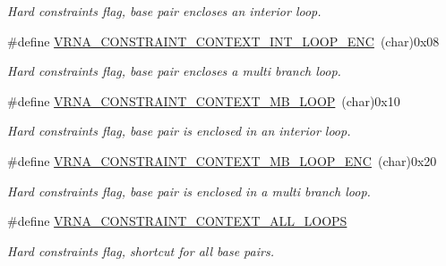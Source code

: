 \begin{DoxyCompactItemize}
\begin{DoxyCompactList}\small\item\em Hard constraints flag, base pair encloses an interior loop. \end{DoxyCompactList}\item 
\hypertarget{group__hard__constraints_ga0536288e04ff6332ecdc23ca4705402b}{\#define \hyperlink{group__hard__constraints_ga0536288e04ff6332ecdc23ca4705402b}{V\-R\-N\-A\-\_\-\-C\-O\-N\-S\-T\-R\-A\-I\-N\-T\-\_\-\-C\-O\-N\-T\-E\-X\-T\-\_\-\-I\-N\-T\-\_\-\-L\-O\-O\-P\-\_\-\-E\-N\-C}~(char)0x08}\label{group__hard__constraints_ga0536288e04ff6332ecdc23ca4705402b}

\begin{DoxyCompactList}\small\item\em Hard constraints flag, base pair encloses a multi branch loop. \end{DoxyCompactList}\item 
\hypertarget{group__hard__constraints_ga456ecd2ff00056bb64da8dd4f61bbfc5}{\#define \hyperlink{group__hard__constraints_ga456ecd2ff00056bb64da8dd4f61bbfc5}{V\-R\-N\-A\-\_\-\-C\-O\-N\-S\-T\-R\-A\-I\-N\-T\-\_\-\-C\-O\-N\-T\-E\-X\-T\-\_\-\-M\-B\-\_\-\-L\-O\-O\-P}~(char)0x10}\label{group__hard__constraints_ga456ecd2ff00056bb64da8dd4f61bbfc5}

\begin{DoxyCompactList}\small\item\em Hard constraints flag, base pair is enclosed in an interior loop. \end{DoxyCompactList}\item 
\hypertarget{group__hard__constraints_ga02a3d703ddbcfce393e4bbfcb9db7077}{\#define \hyperlink{group__hard__constraints_ga02a3d703ddbcfce393e4bbfcb9db7077}{V\-R\-N\-A\-\_\-\-C\-O\-N\-S\-T\-R\-A\-I\-N\-T\-\_\-\-C\-O\-N\-T\-E\-X\-T\-\_\-\-M\-B\-\_\-\-L\-O\-O\-P\-\_\-\-E\-N\-C}~(char)0x20}\label{group__hard__constraints_ga02a3d703ddbcfce393e4bbfcb9db7077}

\begin{DoxyCompactList}\small\item\em Hard constraints flag, base pair is enclosed in a multi branch loop. \end{DoxyCompactList}\item 
\hypertarget{group__hard__constraints_ga886d9127c49bb982a4b67cd7581e8a5a}{\#define \hyperlink{group__hard__constraints_ga886d9127c49bb982a4b67cd7581e8a5a}{V\-R\-N\-A\-\_\-\-C\-O\-N\-S\-T\-R\-A\-I\-N\-T\-\_\-\-C\-O\-N\-T\-E\-X\-T\-\_\-\-A\-L\-L\-\_\-\-L\-O\-O\-P\-S}}\label{group__hard__constraints_ga886d9127c49bb982a4b67cd7581e8a5a}

\begin{DoxyCompactList}\small\item\em Hard constraints flag, shortcut for all base pairs. \end{DoxyCompactList}\end{DoxyCompactItemize}
